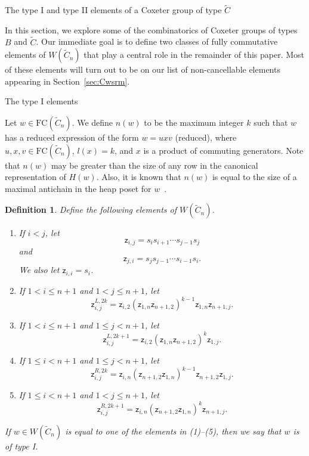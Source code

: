 \documentclass[12pt]{amsart}
\newtheorem{defn}[thm]{Definition}
\newcommand{\C}{\widetilde{C}}
\newcommand{\z}{\mathsf{z}}
\renewcommand{\(}{\left(}
\renewcommand{\)}{\right)}
\newcommand{\FC}{\mathrm{FC}}
\begin{document}
\begin{section}{The type {I} and type II elements of a Coxeter group of type $\C$}\label{sec:type_I_and_II}

In this section, we explore some of the combinatorics of Coxeter groups of types $B$ and $\C$.  Our immediate goal is to define two classes of fully commutative elements of $W(\C_{n})$ that play a central role in the remainder of this paper.  Most of these elements will turn out to be on our list of non-cancellable elements appearing in Section~\ref{sec:Cwsrm}.


\begin{subsection}{The type I elements}

Let $w \in \FC(\C_{n})$.  We define $n(w)$ to be the maximum integer $k$ such that $w$ has a reduced expression of the form $w = u x v$ (reduced), where $u, x, v \in \FC(\C_{n})$, $l(x)=k$, and $x$ is a product of commuting generators.  Note that $n(w)$ may be greater than the size of any row in the canonical representation of $H(w)$.  Also, it is known that $n(w)$ is equal to the size of a maximal antichain in the heap poset for $w$~\cite[Lemma 2.9]{Shi.J:C}.

\begin{defn}\label{def:zigzags}
Define the following elements of $W(\C_{n})$.
\begin{enumerate}
\item If $i<j$, let
\[
\z_{i,j}=s_{i}s_{i+1}\cdots s_{j-1}s_{j}
\]
and
\[
\z_{j,i}=s_{j}s_{j-1}\cdots s_{i-1}s_{i}.
\]
We also let $\z_{i,i}=s_{i}$.

\item If $1< i \leq n+1$ and $1 < j \leq n+1$, let
\[
\z^{L,2k}_{i,j}=\z_{i,2}(\z_{1,n}\z_{n+1,2})^{k-1}\z_{1,n}\z_{n+1,j}.
\]
\item If $1< i \leq n+1$ and $1 \leq j < n+1$, let
\[
\z^{L,2k+1}_{i,j}=\z_{i,2}(\z_{1,n}\z_{n+1,2})^{k}\z_{1,j}.
\]

\item If $1\leq i < n+1$ and $1 \leq j <  n+1$, let
\[
\z^{R,2k}_{i,j}=\z_{i,n}(\z_{n+1,2}\z_{1,n})^{k-1}\z_{n+1,2}\z_{1,j}.
\]
	
\item If $1\leq i < n+1$ and $1 < j \leq  n+1$, let 
\[
\z^{R,2k+1}_{i,j}=\z_{i,n}(\z_{n+1,2}\z_{1,n})^{k}\z_{n+1,j}.
\]

\end{enumerate}
If $w \in W(\C_n)$ is equal to one of the elements in (1)--(5), then we say that $w$ is of \emph{type I}.
\end{defn}


\end{subsection}
\end{section}
\end{document}

